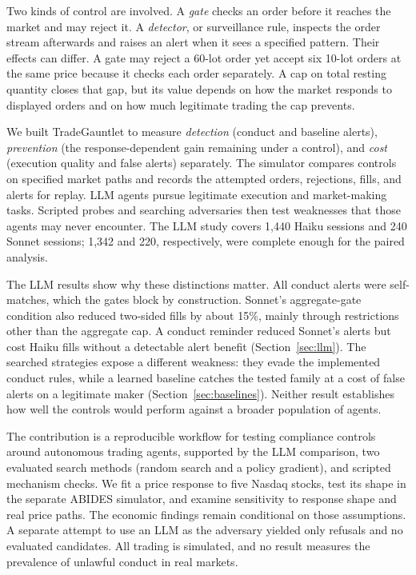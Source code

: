 \documentclass{article}
\begin{document}
Two kinds of control are involved. A \emph{gate} checks an order before it reaches the market and may reject it. A \emph{detector}, or surveillance rule, inspects the order stream afterwards and raises an alert when it sees a specified pattern. Their effects can differ. A gate may reject a 60-lot order yet accept six 10-lot orders at the same price because it checks each order separately. A cap on total resting quantity closes that gap, but its value depends on how the market responds to displayed orders and on how much legitimate trading the cap prevents.

We built TradeGauntlet to measure \emph{detection} (conduct and baseline alerts), \emph{prevention} (the response-dependent gain remaining under a control), and \emph{cost} (execution quality and false alerts) separately. The simulator compares controls on specified market paths and records the attempted orders, rejections, fills, and alerts for replay. LLM agents pursue legitimate execution and market-making tasks. Scripted probes and searching adversaries then test weaknesses that those agents may never encounter. The LLM study covers 1,440 Haiku sessions and 240 Sonnet sessions; 1,342 and 220, respectively, were complete enough for the paired analysis.

The LLM results show why these distinctions matter. All conduct alerts were self-matches, which the gates block by construction. Sonnet's aggregate-gate condition also reduced two-sided fills by about 15\%, mainly through restrictions other than the aggregate cap. A conduct reminder reduced Sonnet's alerts but cost Haiku fills without a detectable alert benefit (Section~\ref{sec:llm}). The searched strategies expose a different weakness: they evade the implemented conduct rules, while a learned baseline catches the tested family at a cost of false alerts on a legitimate maker (Section~\ref{sec:baselines}). Neither result establishes how well the controls would perform against a broader population of agents.

The contribution is a reproducible workflow for testing compliance controls around autonomous trading agents, supported by the LLM comparison, two evaluated search methods (random search and a policy gradient), and scripted mechanism checks. We fit a price response to five Nasdaq stocks, test its shape in the separate ABIDES simulator, and examine sensitivity to response shape and real price paths. The economic findings remain conditional on those assumptions. A separate attempt to use an LLM as the adversary yielded only refusals and no evaluated candidates. All trading is simulated, and no result measures the prevalence of unlawful conduct in real markets.
\end{document}
